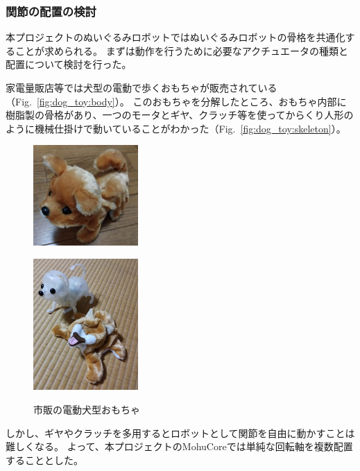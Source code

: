 \documentclass[uplatex,a4paper,12pt]{jsarticle}
\renewcommand{\figurename}{Fig.}
\newcommand{\figref}[1]{\figurename~\ref{#1}}
\begin{document}
\subsubsection{関節の配置の検討}
本プロジェクトのぬいぐるみロボットではぬいぐるみロボットの骨格を共通化することが求められる。
まずは動作を行うために必要なアクチュエータの種類と配置について検討を行った。

家電量販店等では犬型の電動で歩くおもちゃが販売されている（\figref{fig:dog_toy:body}）。
このおもちゃを分解したところ、おもちゃ内部に樹脂製の骨格があり、一つのモータとギヤ、クラッチ等を使ってからくり人形のように機械仕掛けで動いていることがわかった（\figref{fig:dog_toy:skeleton}）。
\begin{figure}[htbp]
  \centering
  \begin{minipage}[c]{0.48\linewidth}
    \centering
    \includegraphics[keepaspectratio,width=4cm,clip]{images/dog_toy/dog.jpg}
    \label{fig:dog_toy:body}
  \end{minipage}
  \begin{minipage}[c]{0.48\linewidth}
    \centering
    \includegraphics[keepaspectratio,width=4cm,clip]{images/dog_toy/skeleton.jpg}
    \label{fig:dog_toy:skeleton}
  \end{minipage}
  \caption{市販の電動犬型おもちゃ}
  \label{fig:dog_toy}
\end{figure}

しかし、ギヤやクラッチを多用するとロボットとして関節を自由に動かすことは難しくなる。
よって、本プロジェクトのMohuCoreでは単純な回転軸を複数配置することとした。
\end{document}
